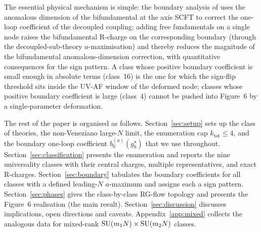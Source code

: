 The essential physical mechanism is simple: the boundary analysis of
\cite{IW2005} uses the anomalous dimension of the bifundamental at
the axis SCFT to correct the one-loop coefficient of the decoupled
coupling; adding free fundamentals on a single node raises the
bifundamental R-charge on the corresponding boundary (through the
decoupled-sub-theory $a$-maximisation) and thereby reduces the
magnitude of the bifundamental anomalous-dimension correction, with
quantitative consequences for the sign pattern.  A class whose positive
boundary coefficient is small enough in absolute terms (class~16) is
the one for which the sign-flip threshold sits inside the UV-AF
window of the deformed node; classes whose positive boundary
coefficient is large (class~4) cannot be pushed into Figure~6 by a
single-parameter deformation.

\medskip
The rest of the paper is organised as follows.
Section~\ref{sec:setup} sets up the class of theories, the
non-Veneziano large-$N$ limit, the enumeration cap $k_{\text{tot}}\le
4$, and the boundary one-loop coefficient
$b_{0}^{(a)}(g_{b}^{\star})$ that we use throughout.
Section~\ref{sec:classification} presents the enumeration and
reports the nine universality classes with their central charges,
multiple representatives, and exact R-charges.
Section~\ref{sec:boundary} tabulates the boundary coefficients for
all classes with a defined leading-$N$ $a$-maximum and assigns each a
sign pattern.
Section~\ref{sec:phases} gives the class-by-class RG-flow topology
and presents the Figure~6 realisation (the main result).
Section~\ref{sec:discussion} discusses implications, open directions
and caveats.  Appendix~\ref{app:mixed} collects the analogous data
for mixed-rank $\mathrm{SU}(m_{1}N)\times\mathrm{SU}(m_{2}N)$ classes.
